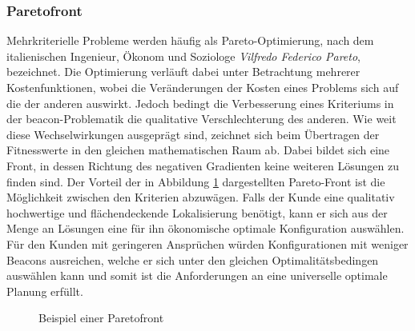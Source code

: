 \subsubsection{Paretofront}
Mehrkriterielle Probleme werden häufig als Pareto-Optimierung, nach dem italienischen Ingenieur, Ökonom und Soziologe \textit{Vilfredo Federico Pareto}, bezeichnet. Die Optimierung verläuft dabei unter Betrachtung mehrerer Kostenfunktionen, wobei die Veränderungen der Kosten eines Problems sich auf die der anderen auswirkt. Jedoch bedingt die Verbesserung eines Kriteriums in der beacon-Problematik die qualitative Verschlechterung des anderen. Wie weit diese Wechselwirkungen ausgeprägt sind, zeichnet sich beim Übertragen der Fitnesswerte in den gleichen mathematischen Raum ab. Dabei bildet sich eine Front, in dessen Richtung des negativen Gradienten keine weiteren Lösungen zu finden sind. Der Vorteil der in Abbildung \ref{fig:Paretofront} dargestellten Pareto-Front ist die Möglichkeit zwischen den Kriterien abzuwägen. Falls der Kunde eine qualitativ hochwertige und flächendeckende Lokalisierung benötigt, kann er sich aus der Menge an Lösungen eine für ihn ökonomische optimale Konfiguration auswählen. Für den Kunden mit geringeren Ansprüchen würden Konfigurationen mit weniger Beacons ausreichen, welche er sich unter den gleichen Optimalitätsbedingen auswählen kann und somit ist die Anforderungen an eine universelle optimale Planung erfüllt.
\begin{figure}[H] 
\centering
{}
\caption{Beispiel einer Paretofront}
\label{fig:Paretofront}
\end{figure}
